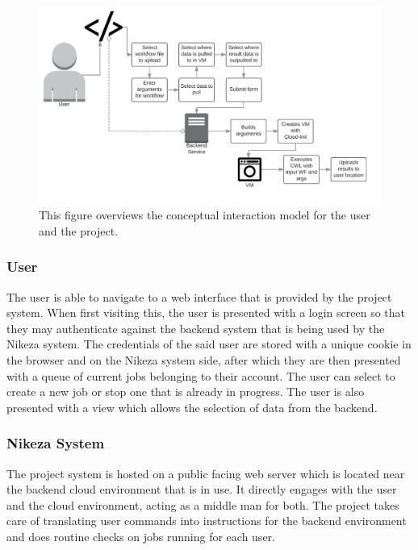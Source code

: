\begin{figure}[ht!]
\centering
\includegraphics[width=\textwidth]{Figures/2_conceptual_model.png}
\decoRule
\caption[Nikeza System Concept]{This figure overviews the conceptual interaction model for the user and the project.}
\label{fig:sytem_concept}
\end{figure}

\subsubsection{User}

The user is able to navigate to a web interface that is provided by the project system. When first visiting this, the user is presented with a login screen so that they may authenticate against the backend system that is being used by the Nikeza system. The credentials of the said user are stored with a unique cookie in the browser and on the Nikeza system side, after which they are then presented with a queue of current jobs belonging to their account. The user can select to create a new job or stop one that is already in progress. The user is also presented with a view which allows the selection of data from the backend.

\subsubsection{Nikeza System}

The project system is hosted on a public facing web server which is located near the backend cloud environment that is in use. It directly engages with the user and the cloud environment, acting as a middle man for both. The project takes care of translating user commands into instructions for the backend environment and does routine checks on jobs running for each user.

